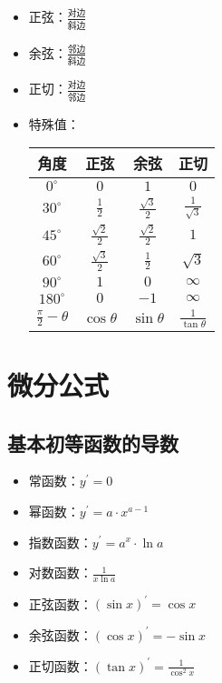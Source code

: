 \begin{itemize}
    \item 正弦：$\frac{对边}{斜边}$
    \item 余弦：$\frac{邻边}{斜边}$
    \item 正切：$\frac{对边}{邻边}$
    \item 特殊值：
    \begin{center}
        \renewcommand\arraystretch{1.2}
        \begin{tabular}{c|ccc}
            \hline
            角度 & 正弦 & 余弦 & 正切 \\\hline
            $0^\circ$   & $0$              & $1$              & $0$              \\
            $30^\circ$  & $\frac12$        & $\frac{\sqrt3}2$ & $\frac1{\sqrt3}$ \\
            $45^\circ$  & $\frac{\sqrt2}2$ & $\frac{\sqrt2}2$ & $1$              \\
            $60^\circ$  & $\frac{\sqrt3}2$ & $\frac12$        & $\sqrt3$         \\
            $90^\circ$  & $1$              & $0$              & $\infty$         \\
            $180^\circ$ & $0$              & $-1$             & $\infty$         \\
            $\frac\pi2-\theta$ & $\cos\theta$ & $\sin\theta$ & $\frac1{\tan\theta}$\\
            \hline
        \end{tabular}
    \end{center}
\end{itemize}

\section{微分公式}

\subsection{基本初等函数的导数}

\begin{itemize}
    \item 常函数：$y^\prime=0$
    \item 幂函数：$y^\prime=a\cdot x^{a-1}$
    \item 指数函数：$y^\prime=a^x\cdot\ln a$
    \item 对数函数：$\frac1{x\ln a}$
    \item 正弦函数：$(\sin x)^\prime=\cos x$
    \item 余弦函数：$(\cos x)^\prime=-\sin x$
    \item 正切函数：$(\tan x)^\prime=\frac1{\cos^2x}$
\end{itemize}

